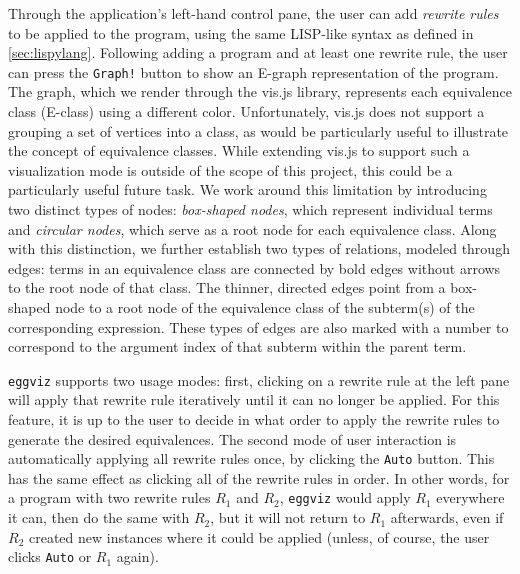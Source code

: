 \documentclass[letterpaper,twocolumn,11pt]{article}
\begin{document}
Through the application's left-hand control pane, the user can add
\textit{rewrite rules} to be applied to the program, using the same LISP-like
syntax as defined in \ref{sec:lispylang}. Following adding a program and at
least one rewrite rule, the user can press the \texttt{Graph!} button to show an
E-graph representation of the program. The graph, which we render through the
vis.js\cite{vis} library, represents each equivalence class (E-class) using a
different color. Unfortunately, vis.js does not support a grouping a set of
vertices into a class, as would be particularly useful to illustrate the concept
of equivalence classes. While extending vis.js to support such a visualization
mode is outside of the scope of this project, this could be a particularly
useful future task. We work around this limitation by introducing two distinct
types of nodes: \textit{box-shaped nodes}, which represent individual terms and
\textit{circular nodes}, which serve as a root node for each equivalence class.
Along with this distinction, we further establish two types of relations,
modeled through edges: terms in an equivalence class are connected by bold edges
without arrows to the root node of that class. The thinner, directed edges point
from a box-shaped node to a root node of the equivalence class of the subterm(s)
of the corresponding expression. These types of edges are also marked with a
number to correspond to the argument index of that subterm within the parent
term.

\texttt{eggviz} supports two usage modes: first, clicking on a rewrite rule at
the left pane will apply that rewrite rule iteratively until it can no longer be
applied. For this feature, it is up to the user to decide in what order to apply
the rewrite rules to generate the desired equivalences. The second mode of user
interaction is automatically applying all rewrite rules once, by clicking the
\texttt{Auto} button. This has the same effect as clicking all of the rewrite
rules in order. In other words, for a program with two rewrite rules $R_1$ and
$R_2$, \texttt{eggviz} would apply $R_1$ everywhere it can, then do the same
with $R_2$, but it will not return to $R_1$ afterwards, even if $R_2$ created
new instances where it could be applied (unless, of course, the user clicks
\texttt{Auto} or $R_1$ again).
\end{document}
